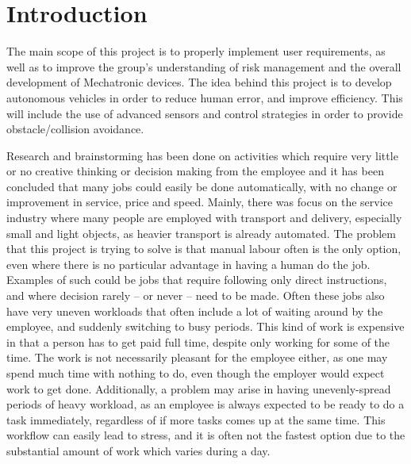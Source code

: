 \documentclass[11pt]{article}
\begin{document}
\lstset{style=customc}
\newpage
{}
\section{Introduction}
The main scope of this project is to properly implement user requirements, as well as to improve the group’s understanding of risk management and the overall development of Mechatronic devices. The idea behind this project is to develop autonomous vehicles in order to reduce human error, and improve efficiency. This will include the use of advanced sensors and control strategies in order to provide obstacle/collision avoidance.


Research and brainstorming has been done on activities which require very little or no creative thinking or decision making from the employee and it has been concluded that many jobs could easily be done automatically, with no change or improvement in service, price and speed.  Mainly, there was focus on the service industry where many people are employed with transport and delivery, especially small and light objects, as heavier transport is already automated. The problem that this project is trying to solve is that manual labour often is the only option, even where there is no particular advantage in having a human do the job. Examples of such could be jobs that require following only direct instructions, and where decision rarely – or never – need to be made. Often these jobs also have very uneven workloads that often include a lot of waiting around by the employee, and suddenly switching to busy periods.  This kind of work is expensive in that a person has to get paid full time, despite only working for some of the time. The work is not necessarily pleasant for the employee either, as one may spend much time with nothing to do, even though the employer would expect work to get done. Additionally, a problem may arise in having unevenly-spread periods of heavy workload, as an employee is always expected to be ready to do a task immediately, regardless of if more tasks comes up at the same time. This workflow can easily lead to stress, and it is often not the fastest option due to the substantial amount of work which varies during a day.
\end{document}
